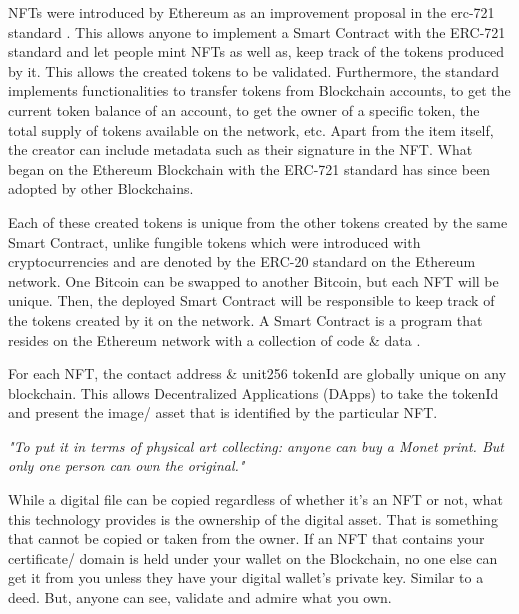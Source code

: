 \documentclass[a4paper, 12pt, oneside]{report}
\begin{document}
NFTs were introduced by Ethereum \autocite{wood_ethereum_2014} as an improvement proposal \autocite{noauthor_eip-2309_nodate, noauthor_erc_nodate} in the \gls{erc}-721 standard \autocite{noauthor_erc-721_nodate}. This allows anyone to implement a Smart Contract with the ERC-721 standard and let people mint NFTs as well as, keep track of the tokens produced by it. This allows the created tokens to be validated. Furthermore, the standard implements functionalities to transfer tokens from Blockchain accounts, to get the current token balance of an account, to get the owner of a specific token, the total supply of tokens available on the network, etc. Apart from the item itself, the creator can include metadata such as their signature in the NFT. What began on the Ethereum Blockchain with the ERC-721 standard has since been adopted by other Blockchains. 

\bigbreak
Each of these created tokens is unique from the other tokens created by the same Smart Contract, unlike fungible tokens which were introduced with cryptocurrencies and are denoted by the ERC-20 standard \autocite{noauthor_erc-20_nodate} on the Ethereum network. One Bitcoin can be swapped to another Bitcoin, but each NFT will be unique.
Then, the deployed Smart Contract will be responsible to keep track of the tokens created by it on the network. A Smart Contract is a program that resides on the Ethereum network with a collection of code \& data \autocite{noauthor_introduction_nodate}.

For each NFT, the contact address \& unit256 tokenId are globally unique on any blockchain. This allows Decentralized Applications (DApps) \autocite{frankenfield_decentralized_nodate, noauthor_decentralized_2021} to take the tokenId and present the image/ asset that is identified by the particular NFT.

\bigbreak
\emph{"To put it in terms of physical art collecting: anyone can buy a Monet print. But only one person can own the original."} \autocite{clark_people_2021}

While a digital file can be copied regardless of whether it's an NFT or not, what this technology provides is the ownership of the digital asset. That is something that cannot be copied or taken from the owner. If an NFT that contains your certificate/ domain is held under your wallet on the Blockchain, no one else can get it from you unless they have your digital wallet's private key. Similar to a deed. But, anyone can see, validate and admire what you own.
\end{document}
